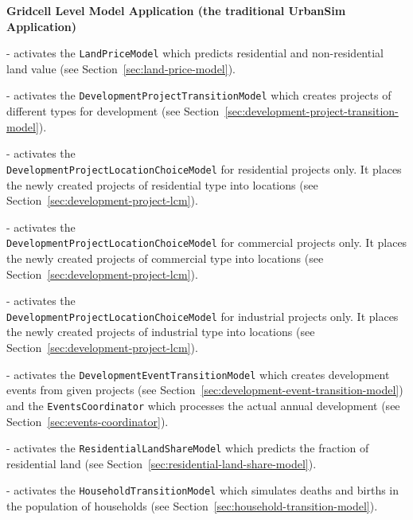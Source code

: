 \bf{Gridcell Level Model Application (the traditional UrbanSim Application)}
\begin{description}
  \tight
  \item[``land_price_model''] - activates the \verb|LandPriceModel| which
  predicts residential and non-residential land value (see
  Section~\ref{sec:land-price-model}).
  \item[``development_project_transition_model''] - activates the
  \verb|DevelopmentProjectTransitionModel| which creates projects of different
  types for development (see
  Section~\ref{sec:development-project-transition-model}).
  \item[``residential_development_project_location_choice_model''] - activates
  the \\ \verb|DevelopmentProjectLocationChoiceModel| for residential projects
  only. It places the newly created projects of residential type into locations
  (see Section~\ref{sec:development-project-lcm}).
  \item[``commercial_development_project_location_choice_model''] - activates
  the \\ \verb|DevelopmentProjectLocationChoiceModel| for commercial projects
  only. It places the newly created projects of commercial type into locations
  (see Section~\ref{sec:development-project-lcm}).
  \item[``industrial_development_project_location_choice_model''] - activates
  the \\ \verb|DevelopmentProjectLocationChoiceModel| for industrial projects
  only. It places the newly created projects of industrial type into locations
  (see Section~\ref{sec:development-project-lcm}).
  \item[``development_event_transition_model''] - activates the
  \verb|DevelopmentEventTransitionModel| which creates development events from
  given projects (see Section~\ref{sec:development-event-transition-model}) and
  the \verb|EventsCoordinator| which processes the actual annual development
  (see Section~\ref{sec:events-coordinator}).
  \item[``residential_land_share_model''] - activates the
  \verb|ResidentialLandShareModel| which predicts the fraction of residential
  land (see Section~\ref{sec:residential-land-share-model}).
  \item[``household_transition_model''] - activates the
  \verb|HouseholdTransitionModel| which simulates deaths and births in the
  population of households (see Section~\ref{sec:household-transition-model}).

\end{description}

